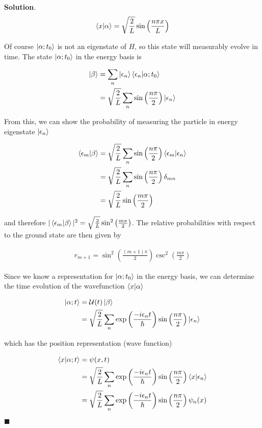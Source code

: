\documentclass[12pt]{article}
\theoremstyle{definition}
\newenvironment{s}{%
        \begin{trivlist} \item \textbf{Solution}. }{%
            \hspace*{\fill} $\blacksquare$\end{trivlist}}%
\begin{document}
{\begin{s}
\begin{align*}
\bra{x}\ket{\alpha} = \sqrt{\frac{2}{L}}\sin\left(\frac{n\pi x}{L}\right)
\end{align*}

Of course $\ket{\alpha; t_{0}}$ is not an eigenstate of $H$, so this state will measurably evolve in time. The state $\ket{\alpha; t_{0}}$ in the energy basis is

\begin{align*}
\ket{\beta} &= \sum_{n}\ket{\epsilon_{n}}\bra{\epsilon_{n}}\ket{\alpha;t_{0}}\\
&=  \sqrt{\frac{2}{L}}\sum_{n}\sin\left(\frac{n\pi}{2}\right)\ket{\epsilon_{n}}
\end{align*}

From this, we can show the probability of measuring the particle in energy eigenstate $\ket{\epsilon_{n}}$

\begin{align*}
\bra{\epsilon_{m}}\ket{\beta} &= \sqrt{\frac{2}{L}}\sum_{n}\sin\left(\frac{n\pi}{2}\right)\bra{\epsilon_{m}}\ket{\epsilon_{n}}\\
&= \sqrt{\frac{2}{L}}\sum_{n}\sin\left(\frac{n\pi}{2}\right)\delta_{mn}\\
&= \sqrt{\frac{2}{L}}\sin\left(\frac{m\pi}{2}\right)\\
\end{align*}

and therefore $|\bra{\epsilon_{m}}\ket{\beta}|^{2} = \sqrt{\frac{2}{L}}\sin^{2}\left(\frac{m\pi}{2}\right)$. The relative probabilities with respect to the ground state are then given by

\begin{align*}
r_{m+1} = \sin^{2}\left(\frac{(m+1)\pi}{2}\right)\csc^{2}\left(\frac{m\pi}{2}\right)
\end{align*}


Since we know a representation for $\ket{\alpha;t_{0}}$ in the energy basis, we can determine the time evolution of the wavefunction $\bra{x}\ket{\alpha}$

\begin{align*}
\ket{\alpha;t} &= \mathcal{U}(t)\ket{\beta} \\
&= \sqrt{\frac{2}{L}}\sum_{n}\exp\left(\frac{-i\epsilon_{n}t}{\hbar}\right)\sin\left(\frac{n\pi}{2}\right)\ket{\epsilon_{n}}
\end{align*}

which has the position representation (wave function)

\begin{align*}
\bra{x}\ket{\alpha; t} &= \psi(x,t)\\
&= \sqrt{\frac{2}{L}}\sum_{n}\exp\left(\frac{-i\epsilon_{n}t}{\hbar}\right)\sin\left(\frac{n\pi}{2}\right)\bra{x}\ket{\epsilon_{n}}\\
&= \sqrt{\frac{2}{L}}\sum_{n}\exp\left(\frac{-i\epsilon_{n}t}{\hbar}\right)\sin\left(\frac{n\pi}{2}\right)\psi_{n}(x)
\end{align*}


\end{s}}
\end{document}
